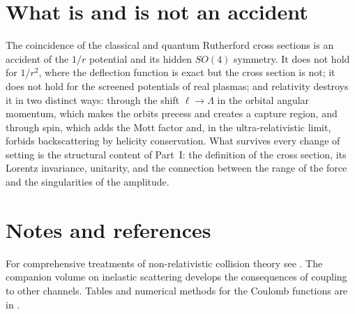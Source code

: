 \documentclass[11pt,a4paper]{book}
\numberwithin{equation}{chapter}
\begin{document}
\section{What is and is not an accident}

The coincidence of the classical and quantum Rutherford cross sections is an
accident of the $1/r$ potential and its hidden $SO(4)$ symmetry. It does not hold
for $1/r^2$, where the deflection function is exact but the cross section is not;
it does not hold for the screened potentials of real plasmas; and relativity
destroys it in two distinct ways: through the shift $\ell\to\Lambda$ in the
orbital angular momentum, which makes the orbits precess and creates a capture
region, and through spin, which adds the Mott factor and, in the ultra-relativistic
limit, forbids backscattering by helicity conservation. What survives every
change of setting is the structural content of Part~I: the definition of the cross
section, its Lorentz invariance, unitarity, and the connection between the range
of the force and the singularities of the amplitude.

\section*{Notes and references}
For comprehensive treatments of non-relativistic collision theory see \cite{MM,Newton,Taylor,GW}. The companion volume on inelastic scattering develops the consequences of coupling to other channels. Tables and numerical methods for the Coulomb functions are in \cite{AS,DLMF,Seaton02}.
\end{document}

